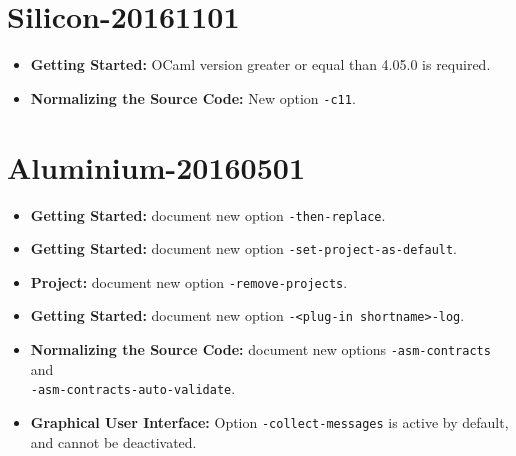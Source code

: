 \section*{Silicon-20161101}

\begin{itemize}
\item \textbf{Getting Started:} OCaml version greater or equal than 4.05.0 is required.
\item \textbf{Normalizing the Source Code:} New option \texttt{-c11}.
\end{itemize}

\section*{Aluminium-20160501}

\begin{itemize}
\item \textbf{Getting Started:} document new option \texttt{-then-replace}.
\item \textbf{Getting Started:} document new option
\texttt{-set-project-as-default}.
\item \textbf{Project:} document new option \texttt{-remove-projects}.
\item \textbf{Getting Started:} document new option
  \texttt{-<plug-in shortname>-log}.
\item \textbf{Normalizing the Source Code:} document new options
  \texttt{-asm-contracts} and\\ \texttt{-asm-contracts-auto-validate}.
\item \textbf{Graphical User Interface:} Option \texttt{-collect-messages} is
  active by default, and cannot be deactivated.
\end{itemize}

